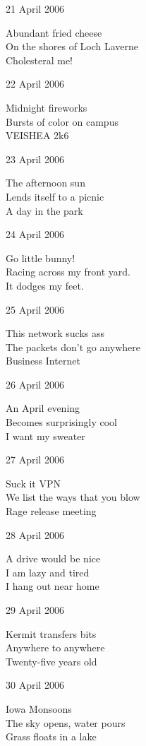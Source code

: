 \documentclass[12pt]{article}
\begin{document}
21 April 2006

Abundant fried cheese \\
On the shores of Loch Laverne \\
Cholesteral me!

22 April 2006

Midnight fireworks \\
Bursts of color on campus \\
VEISHEA 2k6

23 April 2006

The afternoon sun \\
Lends itself to a picnic \\
A day in the park

24 April 2006

Go little bunny! \\
Racing across my front yard. \\
It dodges my feet.


\newpage

25 April 2006

This network sucks ass \\
The packets don't go anywhere \\
Business Internet

26 April 2006

An April evening \\
Becomes surprisingly cool \\
I want my sweater

27 April 2006

Suck it VPN \\
We list the ways that you blow \\
Rage release meeting

28 April 2006

A drive would be nice \\
I am lazy and tired \\
I hang out near home

29 April 2006

Kermit transfers bits \\
Anywhere to anywhere \\
Twenty-five years old

30 April 2006

Iowa Monsoons \\
The sky opens, water pours \\
Grass floats in a lake


\newpage
\end{document}
